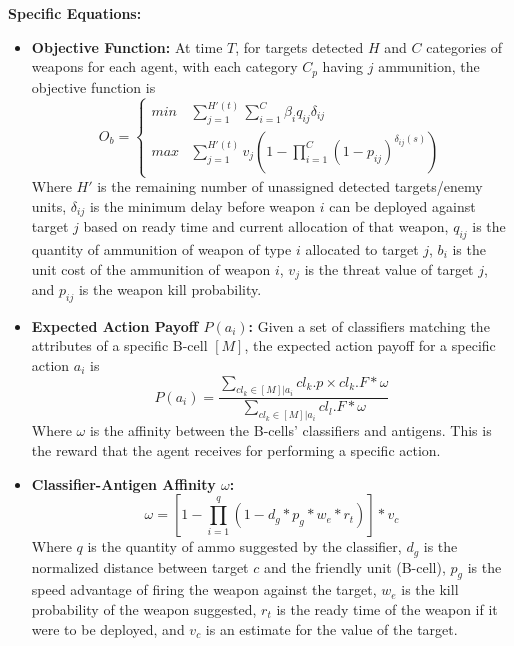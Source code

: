 \documentclass[12pt]{article} %
\begin{document}
    \textbf{Specific Equations:}
    \begin{itemize}
        \item \textbf{Objective Function:} 
        At time $T$, for targets detected $H$ and $C$ categories of weapons for each agent, with each category $C_p$ having $j$ ammunition, the objective function is
            \begin{equation}
                O_{b} = 
                \begin{cases}
                    min & \sum^{H'(t)}_{j=1} \sum^{C}_{i=1}\beta_i q_{ij} \delta_{ij} \\
                    max & \sum^{H'(t)}_{j=1} v_j (1 - \prod^{C}_{i=1} (1-p_{ij})^{\delta_{ij}(s)})
                \end{cases}
            \end{equation}
             Where $H'$ is the remaining number of unassigned detected targets/enemy units, $\delta_{ij}$ is the minimum delay before weapon $i$ can be deployed against target $j$ based on
ready time and current allocation of that weapon, $q_{ij}$ is the quantity of ammunition of weapon of type $i$ allocated to target $j$, $b_i$ is the unit cost of the ammunition of weapon $i$, $v_j$ is the threat value of target $j$, and $p_{ij}$ is the weapon kill probability.
        \item \textbf{Expected Action Payoff $P(a_i)$: } 
            Given a set of classifiers matching the attributes of a specific B-cell $[M]$, the expected action payoff for a specific action $a_i$ is
            \begin{equation}
                P(a_i) = \frac{\sum_{cl_{k} \in [M] | a_i} cl_{k}.p \times cl_k.F * \omega}{\sum_{cl_{k} \in [M] | a_i} cl_l.F * \omega}
            \end{equation}
            Where $\omega$ is the affinity between the B-cells' classifiers and antigens. This is the reward that the agent receives for performing a specific action. 
            
        \item \textbf{Classifier-Antigen Affinity $\omega$: }
            \begin{equation}
                \omega = [1 - \prod^{q}_{i=1}(1-d_g * p_g * w_e * r_t)] * v_c
            \end{equation}
            Where $q$ is the quantity of ammo suggested by the classifier, $d_g$ is the normalized distance between target $c$ and the friendly unit (B-cell), $p_g$ is the speed advantage of firing the weapon against the target, $w_e$ is the kill probability of the weapon suggested, $r_t$ is the ready time of the weapon if it were to be deployed, and $v_c$ is an estimate for the value of the target. 


\end{itemize}
\end{document}
